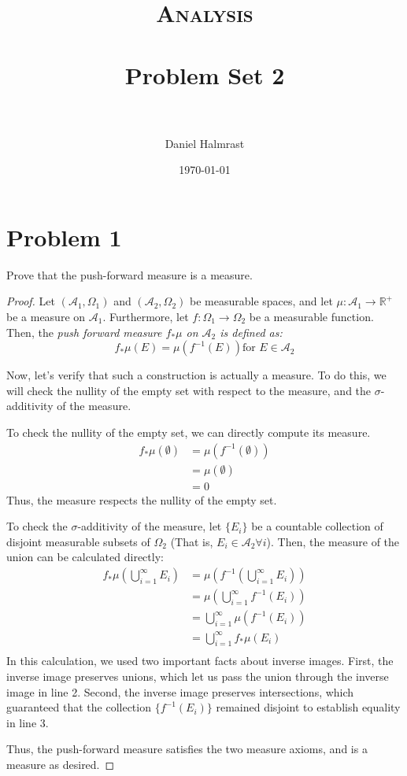 \documentclass[fontsize=11pt]{scrartcl} %
\title{	
\normalfont \normalsize 
\textsc{Analysis} \\ [25pt] %
\horrule{0.5pt} \\[0.4cm] %
\huge Problem Set 2\\ %
\horrule{2pt} \\[0.5cm] %
}
\author{Daniel Halmrast} %
\date{\normalsize\today} %
\numberwithin{equation}{section} %
\numberwithin{figure}{section} %
\numberwithin{table}{section} %
\newcommand{\R}{\mathbb{R}}
\newcommand{\A}{\mathscr{A}}
\begin{document}
\maketitle %

\section*{Problem 1}
Prove that the push-forward measure is a measure.
\\
\begin{proof}
Let $(\A_1,\Omega_1)$ and $(\A_2,\Omega_2)$ be measurable spaces, and let $\mu:\A_1\to\R^+$
be a measure on $\A_1$. Furthermore, let $f:\Omega_1\to\Omega_2$ be a measurable function.
Then, the \em push forward measure \em $f_*\mu$ on $\A_2$ is defined as:
\[
f_*\mu(E) = \mu(f^{-1}(E)) \textrm{for } E\in\A_2
\]

Now, let's verify that such a construction is actually a measure. To do this, we will
check the nullity of the empty set with respect to the measure, and the 
$\sigma$-additivity of the measure.

To check the nullity of the empty set, we can directly compute its measure.
\[
\begin{aligned}
f_*\mu(\emptyset)   &= \mu(f^{-1}(\emptyset))\\
                    &= \mu(\emptyset)\\
                    &=0
\end{aligned}
\]
Thus, the measure respects the nullity of the empty set.

To check the $\sigma$-additivity of the measure, let $\{E_i\}$ be a countable
collection of disjoint measurable subsets of $\Omega_2$ (That is, $E_i\in\A_2\forall i$).
Then, the measure of the union can be calculated directly:
\[
\begin{aligned}
f_*\mu\left(\bigcup_{i=1}^{\infty}E_i\right) &= \mu\left(f^{-1}\left(\bigcup_{i=1}^{\infty} E_i\right)\right)\\
        &=\mu\left(\bigcup_{i=1}^{\infty} f^{-1}(E_i)\right)\\
        &=\bigcup_{i=1}^{\infty} \mu\left(f^{-1}(E_i)\right)\\
        &=\bigcup_{i=1}^{\infty} f_*\mu(E_i)\\
\end{aligned}
\] 
In this calculation, we used two important facts about inverse images. First, the inverse
image preserves unions, which let us pass the union through the inverse image in line 2.
Second, the inverse image preserves intersections, which guaranteed that the collection
$\{f^{-1}(E_i)\}$ remained disjoint to establish equality in line 3.

Thus, the push-forward measure satisfies the two measure axioms, and is a measure as
desired.
\end{proof}
\end{document}
